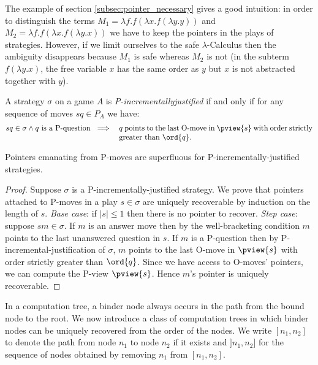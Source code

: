 The example of section \ref{subsec:pointer_necessary} gives a good
intuition: in order to distinguish the terms $M_1 = \lambda f . f
(\lambda x . f (\lambda y .y ))$ and $M_2 = \lambda f . f (\lambda x
. f (\lambda y .x ))$ we have to keep the pointers in the plays of
strategies. However, if we limit ourselves to the safe
$\lambda$-Calculus then the ambiguity disappears because $M_1$ is
safe whereas $M_2$ is not (in the subterm $f (\lambda y . x)$, the
free variable $x$ has the same order as $y$ but $x$ is not
abstracted together with $y$).

\begin{definition}
A strategy $\sigma$ on a game $A$ is
\emph{P-incrementally\-justified} if and only if for any sequence of
moves $s q \in P_A$ we have:
\begin{eqnarray*}
s q \in \sigma \wedge q \mbox{ is a P-question } &\implies&
\parbox[t]{9cm}{$q$  points to the last O-move in $\pview{s}$
with order strictly greater than $\ord{q}$.}
\end{eqnarray*}
\end{definition}

\begin{lemma}
\label{lem:incrjustified_pointers_uniqu_recover} Pointers emanating from P-moves are
superfluous for P-incrementally-justified strategies.
\end{lemma}
\begin{proof}
Suppose $\sigma$ is a P-incrementally-justified strategy. We prove that pointers attached to P-moves in a play $s\in \sigma$ are uniquely recoverable by induction on the length of $s$. \noindent \emph{Base case}: if $|s| \leq 1$ then there is no pointer to recover.
\noindent \emph{Step case}: suppose $s m \in \sigma$. If $m$ is an answer move then by the well-bracketing condition $m$ points
to the last unanswered question in $s$. If $m$ is a P-question then by  P-incremental-justification of $\sigma$, $m$ points to the last O-move in
$\pview{s}$ with order strictly greater than $\ord{q}$. Since we have access to O-moves' pointers, we can compute the P-view $\pview{s}$.
Hence $m$'s pointer is uniquely recoverable.
\end{proof}



In a computation tree, a binder node always occurs in the path from the bound node to the root. We now introduce a class of computation trees in which binder nodes can be uniquely recovered from the order
of the nodes. We write $[n_1,n_2]$ to denote the path from node
$n_1$ to node $n_2$ if it exists and $]n_1,n_2]$ for the sequence of
nodes obtained by removing $n_1$ from $[n_1,n_2]$.

